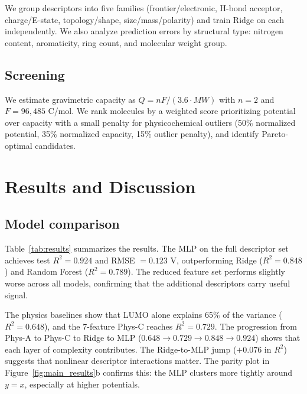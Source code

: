 \documentclass[11pt]{article}
\begin{document}
We group descriptors into five families (frontier/electronic, H-bond acceptor, charge/E-state, topology/shape, size/mass/polarity) and train Ridge on each independently. We also analyze prediction errors by structural type: nitrogen content, aromaticity, ring count, and molecular weight group.

\subsection{Screening}

We estimate gravimetric capacity as $Q = nF / (3.6 \cdot MW)$ with $n = 2$ and $F = 96{,}485$ C/mol. We rank molecules by a weighted score prioritizing potential over capacity with a small penalty for physicochemical outliers (50\% normalized potential, 35\% normalized capacity, 15\% outlier penalty), and identify Pareto-optimal candidates.

\section{Results and Discussion}

\subsection{Model comparison}

Table~\ref{tab:results} summarizes the results. The MLP on the full descriptor set achieves test $R^2 = 0.924$ and RMSE $= 0.123$ V, outperforming Ridge ($R^2 = 0.848$) and Random Forest ($R^2 = 0.789$). The reduced feature set performs slightly worse across all models, confirming that the additional descriptors carry useful signal.

The physics baselines show that LUMO alone explains 65\% of the variance ($R^2 = 0.648$), and the 7-feature Phys-C reaches $R^2 = 0.729$. The progression from Phys-A to Phys-C to Ridge to MLP ($0.648 \to 0.729 \to 0.848 \to 0.924$) shows that each layer of complexity contributes. The Ridge-to-MLP jump ($+0.076$ in $R^2$) suggests that nonlinear descriptor interactions matter. The parity plot in Figure~\ref{fig:main_results}b confirms this: the MLP clusters more tightly around $y = x$, especially at higher potentials.
\end{document}
